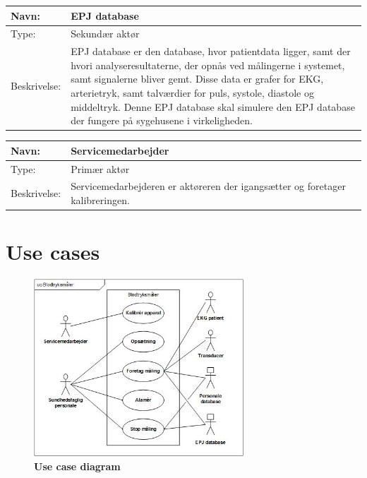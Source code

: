 \begin{table}[h!]
\begin{tabular}{| >{\raggedright\arraybackslash}p{3cm} | >{\raggedright\arraybackslash}p{12cm} |}
   \hline
   Navn: & EPJ database\\ \hline
   Type: & Sekundær aktør \\ \hline
   Beskrivelse: & EPJ database er den database, hvor patientdata ligger, samt der hvori analyseresultaterne, der opnås ved målingerne i systemet, samt signalerne bliver gemt. Disse data er grafer for EKG, arterietryk, samt talværdier for puls, systole, diastole og middeltryk. Denne EPJ database skal simulere den EPJ database der fungere på sygehusene i virkeligheden.\\ \hline
\end{tabular}
\end{table}


\begin{table}[h!]
\begin{tabular}{| >{\raggedright\arraybackslash}p{3cm} | >{\raggedright\arraybackslash}p{12cm} |}
   \hline
   Navn: & Servicemedarbejder\\ \hline
   Type: & Primær aktør \\ \hline
   Beskrivelse: & Servicemedarbejderen er aktøreren der igangsætter og foretager kalibreringen.\\ \hline
\end{tabular}
\end{table}

\newpage

\section{Use cases}
\begin{figure}[H]
\includegraphics[width =0.7\textwidth , center]{billeder/UseCaseDiagram}
\caption{\textbf{Use case diagram}}
\end{figure}


